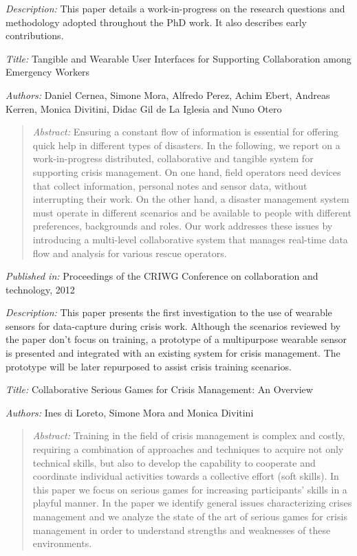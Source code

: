 \emph{Description: }This paper details a work-in-progress on the research questions and methodology adopted throughout the PhD work. It also describes early contributions.


\emph{Title: }Tangible and Wearable User Interfaces for Supporting Collaboration among Emergency Workers

\emph{Authors: }Daniel Cernea, Simone Mora, Alfredo Perez, Achim Ebert, Andreas Kerren, Monica Divitini, Didac Gil de La Iglesia and Nuno Otero

\begin{quote}
	\emph{Abstract: }Ensuring a constant flow of information is essential for offering quick help in different types of disasters. In the following, we report on a work-in-progress distributed, collaborative and tangible system for supporting crisis management. On one hand, field operators need devices that collect information, personal notes and sensor data, without interrupting their work. On the other hand, a disaster management system must operate in different scenarios and be available to people with different preferences, backgrounds and roles. Our work addresses these issues by introducing a multi-level collaborative system that manages real-time data flow and analysis for various rescue operators.
\end{quote}

\emph{Published in: }Proceedings of the CRIWG Conference on collaboration and technology, 2012

\emph{Description: }This paper presents the first investigation to the use of wearable sensors for data-capture during crisis work. Although the scenarios reviewed by the paper don't focus on training, a prototype of a multipurpose wearable sensor is presented and integrated with an existing system for crisis management. The prototype will be later repurposed to assist crisis training scenarios.


\emph{Title: }Collaborative Serious Games for Crisis Management: An Overview

\emph{Authors: }Ines di Loreto, Simone Mora and Monica Divitini

\begin{quote}
	\emph{Abstract: }Training in the field of crisis management is complex and costly, requiring a combination of approaches and techniques to acquire not only technical skills, but also to develop the capability to cooperate and coordinate individual activities towards a collective effort (soft skills). In this paper we focus on serious games for increasing participants’ skills in a playful manner. In the paper we identify general issues characterizing crises management and we analyze the state of the art of serious games for crisis management in order to understand strengths and weaknesses of these environments.
\end{quote}

